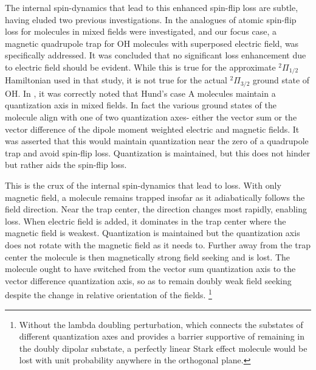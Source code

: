 \documentclass[%
 reprint,
groupedaddress,
 amsmath,amssymb,
 aps,
prl,
]{revtex4-1}
\begin{document}
The internal spin-dynamics that lead to this enhanced spin-flip loss are subtle, having eluded two previous investigations. In \cite{Lara2008} the analogues of atomic spin-flip loss for molecules in mixed fields were investigated, and our focus case, a magnetic quadrupole trap for OH molecules with superposed electric field, was specifically addressed. It was concluded that no significant loss enhancement due to electric field should be evident. While this is true for the approximate $^2\Pi_{1/2}$ Hamiltonian used in that study, it is not true for the actual $^2\Pi_{3/2}$ ground state of OH. In \cite{Bohn2013}, it was correctly noted that Hund's case A molecules maintain a quantization axis in mixed fields. In fact the various ground states of the molecule align with one of two quantization axes- either the vector sum or the vector difference of the dipole moment weighted electric and magnetic fields. It was asserted that this would maintain quantization near the zero of a quadrupole trap and avoid spin-flip loss. Quantization is maintained, but this does not hinder but rather aids the spin-flip loss. 

This is the crux of the internal spin-dynamics that lead to loss. With only magnetic field, a molecule remains trapped insofar as it adiabatically follows the field direction. Near the trap center, the direction changes most rapidly, enabling loss. When electric field is added, it dominates in the trap center where the magnetic field is weakest. Quantization is maintained but the quantization axis does not rotate with the magnetic field as it needs to. Further away from the trap center the molecule is then magnetically strong field seeking and is lost. The molecule ought to have switched from the vector sum quantization axis to the vector difference quantization axis, so as to remain doubly weak field seeking despite the change in relative orientation of the fields. \footnote{Without the lambda doubling perturbation, which connects the substates of different quantization axes and provides a barrier supportive of remaining in the doubly dipolar substate, a perfectly linear Stark effect molecule would be lost with unit probability anywhere in the orthogonal plane.}%
\end{document}
